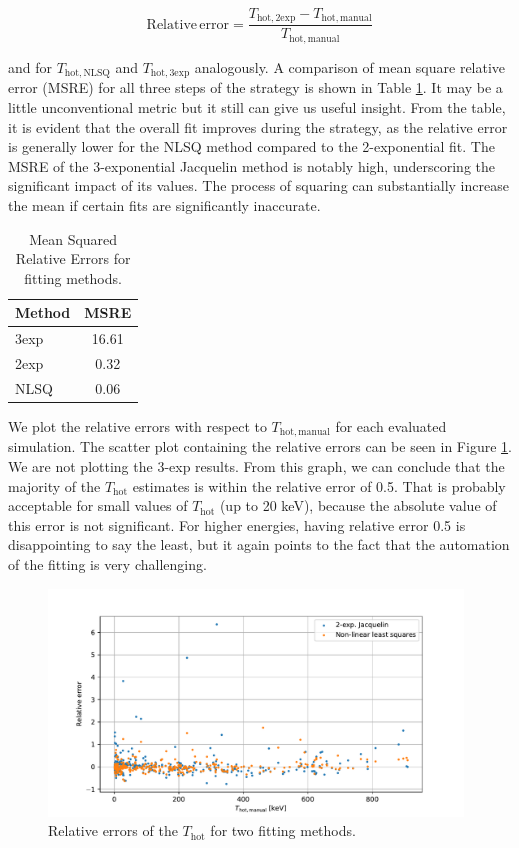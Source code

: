 \begin{equation}
	\mathrm{Relative \, error} = \frac{T_\mathrm{hot,2exp}-T_\mathrm{hot,manual}}{T_\mathrm{hot,manual}}
\end{equation}

and for $T_\mathrm{hot,NLSQ}$ and $T_\mathrm{hot,3exp}$ analogously. A comparison of mean square relative error (MSRE) for all three steps of the strategy is shown in Table \ref{tab:means_mses}. It may be a little unconventional metric but it still can give us useful insight. From the table, it is evident that the overall fit improves during the strategy, as the relative error is generally lower for the NLSQ method compared to the 2-exponential fit. The MSRE of the 3-exponential Jacquelin method is notably high, underscoring the significant impact of its values. The process of squaring can substantially increase the mean if certain fits are significantly inaccurate.

\begin{table}[ht]
	\centering
	\begin{tabular}{lc}
		\toprule
		Method & MSRE \\
		\midrule
		3exp  & 16.61 \\
		2exp  & 0.32 \\
		NLSQ & 0.06 \\
		\bottomrule
	\end{tabular}
	\caption{Mean Squared Relative Errors for fitting methods.}
	\label{tab:means_mses}
\end{table}


We plot the relative errors with respect to $T_\mathrm{hot,manual}$ for each evaluated simulation. The scatter plot containing the relative errors can be seen in Figure \ref{fig:relative-errors}. We are not plotting the 3-exp results. From this graph, we can conclude that the majority of the $T_\mathrm{hot}$ estimates is within the relative error of 0.5. That is probably acceptable for small values of $T_\mathrm{hot}$ (up to 20 keV), because the absolute value of this error is not significant. For higher energies, having relative error 0.5 is disappointing to say the least, but it again points to the fact that the automation of the fitting is very challenging.

\begin{figure}[ht]
	\centering
	\includegraphics[width=0.98\textwidth]{figures/relative-error}
	\caption{Relative errors of the $T_\mathrm{hot}$ for two fitting methods.}
	\label{fig:relative-errors}
\end{figure}


